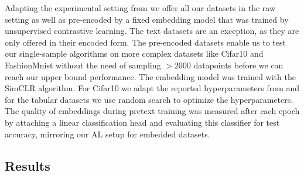 \documentclass[]{article}
\begin{document}
Adapting the experimental setting from \cite{hacohen2022active} we offer all our datasets in the raw setting as well as pre-encoded by a fixed embedding model that was trained by unsupervised contrastive learning. 
The text datasets are an exception, as they are only offered in their encoded form.
The pre-encoded datasets enable us to test our single-sample algorithms on more complex datasets like Cifar10 and FashionMnist without the need of sampling $>2000$ datapoints before we can reach our upper bound performance.
The embedding model was trained with the SimCLR \cite{chen2020simple} algorithm. 
For Cifar10 we adapt the reported hyperparameters from \cite{hacohen2022active} and for the tabular datasets we use random search to optimize the hyperparameters.
The quality of embeddings during pretext training was measured after each epoch by attaching a linear classification head and evaluating this classifier for test accuracy, mirroring our AL setup for embedded datasets.

\subsection{Results}
\end{document}
